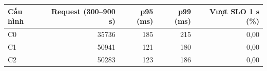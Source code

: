 \begin{tabular}{@{}lrrrr@{}}
\toprule
Cấu hình & Request (300–900 s) & p95 (ms) & p99 (ms) & Vượt SLO 1 s (\%) \\
\midrule
C0 & 35736 & 185 & 215 & 0,00 \\
C1 & 50941 & 121 & 180 & 0,00 \\
C2 & 50283 & 123 & 186 & 0,00 \\
\bottomrule
\end{tabular}